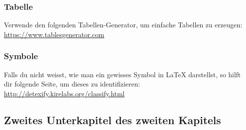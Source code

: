 \subsubsection{Tabelle}

Verwende den folgenden Tabellen-Generator, um einfache Tabellen zu erzeugen: \url{https://www.tablesgenerator.com}

\subsubsection{Symbole}

Falls du nicht weisst, wie man ein gewisses Symbol in LaTeX darstellst, so hilft dir folgende Seite, um dieses zu identifizieren: \url{http://detexify.kirelabs.org/classify.html}


\subsection{Zweites Unterkapitel des zweiten Kapitels}

\lipsum[2-3]
